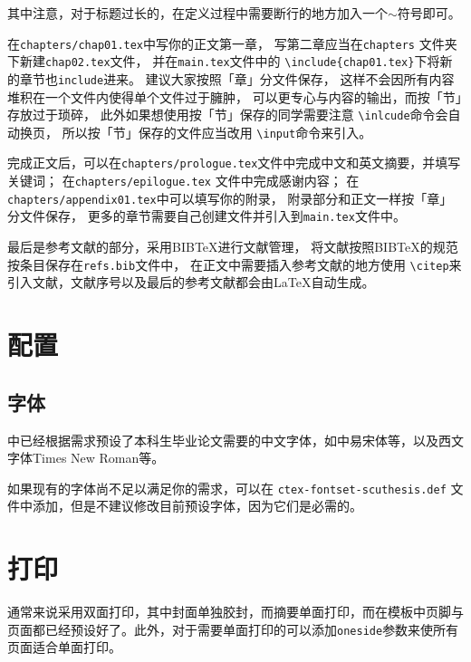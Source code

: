 其中注意，对于标题过长的，在定义过程中需要断行的地方加入一个$\sim$符号即可。

在\texttt{chapters/chap01.tex}中写你的正文第一章，
写第二章应当在\texttt{chapters} 文件夹下新建\texttt{chap02.tex}文件，
并在\texttt{main.tex}文件中的 \texttt{\textbackslash{}include\{chap01.tex\}}下将新的章节也\texttt{include}进来。
\scuthesis{}建议大家按照「章」分文件保存，
这样不会因所有内容堆积在一个文件内使得单个文件过于臃肿，
可以更专心与内容的输出，而按「节」存放过于琐碎，
此外如果想使用按「节」保存的同学需要注意 \texttt{\textbackslash{}inlcude}命令会自动换页，
所以按「节」保存的文件应当改用 \texttt{\textbackslash{}input}命令来引入。

完成正文后，可以在\texttt{chapters/prologue.tex}文件中完成中文和英文摘要，并填写关键词；
在\texttt{chapters/epilogue.tex} 文件中完成感谢内容；
在\texttt{chapters/appendix01.tex}中可以填写你的附录，
附录部分和正文一样按「章」分文件保存，
更多的章节需要自己创建文件并引入到\texttt{main.tex}文件中。

最后是参考文献的部分，\scuthesis{}采用BIB\TeX{}进行文献管理，
将文献按照BIB\TeX{}的规范按条目保存在\texttt{refs.bib}文件中，
在正文中需要插入参考文献的地方使用 \texttt{\textbackslash{}citep}来引入文献，文献序号以及最后的参考文献都会由\LaTeX{}自动生成。

\section{配置}
	\subsection{字体}

	\scuthesis{}中已经根据需求预设了本科生毕业论文需要的中文字体，如中易宋体等，以及西文字体Times New Roman等。

	如果现有的字体尚不足以满足你的需求，可以在 \texttt{ctex-fontset-scuthesis.def} 文件中添加，但是不建议修改目前预设字体，因为它们是必需的\citep{scdxbkbylwgshckwxzlyq_2006}。

\section{打印}
通常来说采用双面打印，其中封面单独胶封，而摘要单面打印，而在模板中页脚与页面都已经预设好了。此外，对于需要单面打印的可以添加\texttt{oneside}参数来使所有页面适合单面打印。
